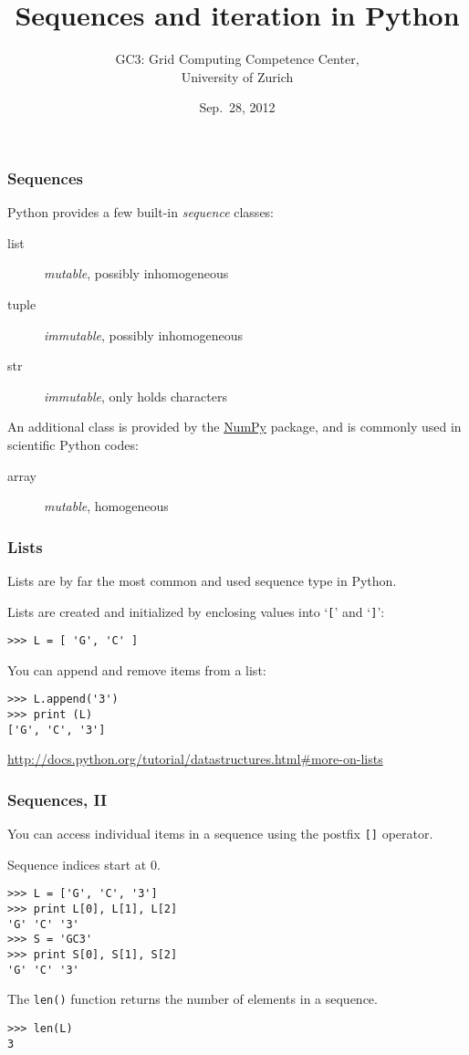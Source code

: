 \documentclass[english,serif,mathserif,xcolor=pdftex,dvipsnames,table]{beamer}
\title[Sequences, Iteration]{%
  Sequences and iteration in Python
}
\author[GC3]{%
  GC3: Grid Computing Competence Center, \\
  University of Zurich
}
\date{Sep.~28, 2012}
\begin{document}
\maketitle


\begin{frame}
  \frametitle{Sequences}

  Python provides a few built-in \emph{sequence} classes:
  \begin{description}
  \item[list] \emph{mutable}, possibly inhomogeneous
  \item[tuple] \emph{immutable}, possibly inhomogeneous
  \item[str] \emph{immutable}, only holds characters
  \end{description}
  An additional class is provided by the
  \href{http://numpy.scipy.org}{NumPy} package, and is commonly used in
  scientific Python codes:
  \begin{description}
  \item[array] \emph{mutable}, homogeneous
  \end{description}
\end{frame}


\begin{frame}[fragile]
  \frametitle{Lists}
  Lists are by far the most common and used sequence type in Python.

  \+
  Lists are created and initialized by enclosing values into
  `\texttt{[}' and `\texttt{]}':
\begin{lstlisting}
>>> L = [ 'G', 'C' ]
\end{lstlisting}

  \+
  You can append and remove items from a list:
\begin{lstlisting}
>>> L.append('3')
>>> print (L)
['G', 'C', '3']
\end{lstlisting}

  \+
  \begin{references}
    \url{http://docs.python.org/tutorial/datastructures.html#more-on-lists}
  \end{references}
\end{frame}


\begin{frame}
  \frametitle{Sequences, II}
  You can access individual items in a sequence using the postfix
  \texttt{[]} operator.

  \+
  Sequence indices start at 0.
\begin{lstlisting}
>>> L = ['G', 'C', '3']
>>> print L[0], L[1], L[2]
'G' 'C' '3'
>>> S = 'GC3'
>>> print S[0], S[1], S[2]
'G' 'C' '3'
\end{lstlisting}

  \+
  The \texttt{len()} function returns the number of elements in a
  sequence.
\begin{lstlisting}
>>> len(L)
3
\end{lstlisting}
\end{frame}
\end{document}
